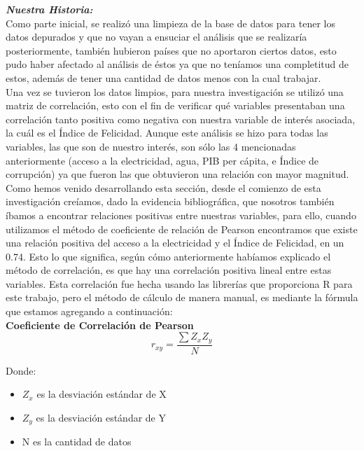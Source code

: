 \textbf{\textit{Nuestra Historia:}} \\

Como parte inicial, se realizó una limpieza de la base de datos para tener los datos depurados y que no vayan a ensuciar el análisis que se realizaría posteriormente, también hubieron países que no aportaron ciertos datos, esto pudo haber afectado al análisis de éstos ya que no teníamos una completitud de estos, además de tener una cantidad de datos menos con la cual trabajar.\\

Una vez se tuvieron los datos limpios, para nuestra investigación se utilizó una matriz de correlación, esto con el fin de verificar qué variables presentaban una correlación tanto positiva como negativa con nuestra variable de interés asociada, la cuál es el Índice de Felicidad. Aunque este análisis se hizo para todas las variables, las que son de nuestro interés, son sólo las 4 mencionadas anteriormente (acceso a la electricidad, agua, PIB per cápita, e Índice de corrupción) ya que fueron las que obtuvieron una relación con mayor magnitud. \\

Como hemos venido desarrollando esta sección, desde el comienzo de esta investigación creíamos, dado la evidencia bibliográfica, que nosotros también íbamos a encontrar relaciones positivas entre nuestras variables, para ello, cuando utilizamos el método de coeficiente de relación de Pearson encontramos que existe una relación positiva del acceso a la electricidad y el Índice de Felicidad, en un 0.74. Esto lo que significa, según cómo anteriormente habíamos explicado el método de correlación, es que hay una correlación positiva lineal entre estas variables. Esta correlación fue hecha usando las librerías que proporciona R para este trabajo, pero el método de cálculo de manera manual, es mediante la fórmula que estamos agregando a continuación: \\

\textbf{Coeficiente de Correlación de Pearson} \\

\begin{equation}
         r_{xy} = \frac{\sum Z_x Z_y}{N} 
    \end{equation}
   
    Donde: 
    
    \begin{itemize}
        \item $Z_x$ es la desviación estándar de X
        \item $Z_y$ es la desviación estándar de Y
        \item N es la cantidad de datos 
    \end{itemize}

